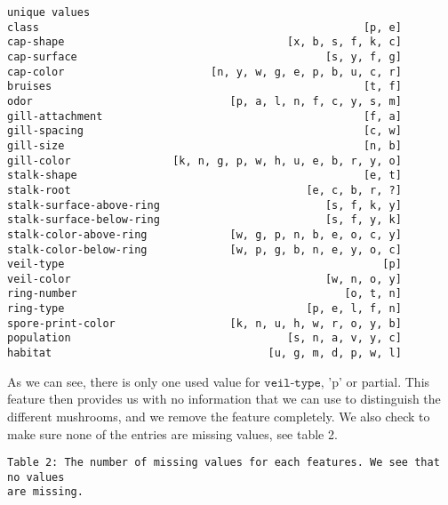 \documentclass[11pt]{article}
\makeatletter
\newcommand{\boxspacing}{\kern\kvtcb@left@rule\kern\kvtcb@boxsep}
\makeatother
\begin{document}
            \begin{tcolorbox}[breakable, size=fbox, boxrule=.5pt, pad at break*=1mm, opacityfill=0]
{\boxspacing}
\begin{Verbatim}[commandchars=\\\{\}]
                                                 unique values  
class                                                   [p, e]
cap-shape                                   [x, b, s, f, k, c]
cap-surface                                       [s, y, f, g]
cap-color                       [n, y, w, g, e, p, b, u, c, r]
bruises                                                 [t, f]
odor                               [p, a, l, n, f, c, y, s, m]
gill-attachment                                         [f, a]
gill-spacing                                            [c, w]
gill-size                                               [n, b]
gill-color                [k, n, g, p, w, h, u, e, b, r, y, o]
stalk-shape                                             [e, t]
stalk-root                                     [e, c, b, r, ?]
stalk-surface-above-ring                          [s, f, k, y]
stalk-surface-below-ring                          [s, f, y, k]
stalk-color-above-ring             [w, g, p, n, b, e, o, c, y]
stalk-color-below-ring             [w, p, g, b, n, e, y, o, c]
veil-type                                                  [p]
veil-color                                        [w, n, o, y]
ring-number                                          [o, t, n]
ring-type                                      [p, e, l, f, n]
spore-print-color                  [k, n, u, h, w, r, o, y, b]
population                                  [s, n, a, v, y, c]
habitat                                  [u, g, m, d, p, w, l]
\end{Verbatim}
\end{tcolorbox}
        
    As we can see, there is only one used value for $\texttt{veil-type}$, 'p' or
partial. This feature then provides us with no information that we can
use to distinguish the different mushrooms, and we remove the feature
completely. We also check to make sure none of the entries are missing
values, see table 2.

    \begin{Verbatim}[commandchars=\\\{\}]
Table 2: The number of missing values for each features. We see that no values
are missing.
    \end{Verbatim}
\end{document}
